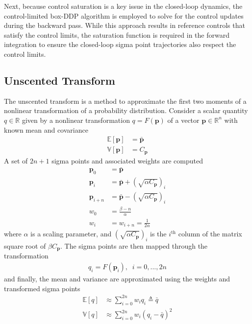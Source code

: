 \documentclass[journal ]{new-aiaa}
\newcommand{\param}{\ensuremath{\mathbf{p}}}
\newcommand{\E}[1]{\mathbb{E}\left[#1\right]}
\newcommand{\V}[1]{\mathbb{V}[#1]}
\newcommand{\cov}{C}
\begin{document}
Next, because control saturation is a key issue in the closed-loop dynamics, the control-limited box-DDP algorithm \cite{DDP_ControlLimited} is employed to solve for the control updates during the backward pass. While this approach results in reference controls that satisfy the control limits, the saturation function is required in the forward integration to ensure the closed-loop sigma point trajectories also respect the control limits.

\subsection*{Unscented Transform}
The unscented transform is a method to approximate the first two moments of a nonlinear transformation of a probability distribution. Consider a scalar quantity $q\in\mathbb{R}$ given by a nonlinear transformation $q = F(\param)$ of a vector $\param\in\mathbb{R}^n$ with known mean and covariance
\begin{align*}
\E{\param} &= \bar{\param}\\
\V{\param} &= \cov_{\param}
\end{align*}
A set of $2n+1$ sigma points and associated weights are computed 
\begin{align*}
\param_0 &= \bar{\param} \\
\param_i &=  \bar{\param} + \left(\sqrt{\alpha \cov_{\param}}\right)_i \\
\param_{i+n} &=  \bar{\param} - \left(\sqrt{\alpha\cov_{\param}}\right)_i \\
w_0 &= \frac{\beta - n}{\alpha} \\
w_i &= w_{i+n} = \frac{1}{2\alpha}
\end{align*}
where $\alpha$ is a scaling parameter, and $\left(\sqrt{\alpha \cov_{\param}}\right)_i$ is the $i^{\mathrm{th}}$ column of the matrix square root of $\beta \cov_{\param}$. The sigma points are then mapped through the transformation
\begin{align}
q_i = F(\param_i),\;\;i=0,...,2n
\end{align}
and finally, the mean and variance are approximated using the weights and transformed sigma points
\begin{align*}
\E{q} &\approx \sum_{i=0}^{2n}w_iq_i  \triangleq \bar{q}\\
\V{q} &\approx \sum_{i=0}^{2n}w_i\left(q_i - \bar{q}\right)^2
\end{align*}
\end{document}
